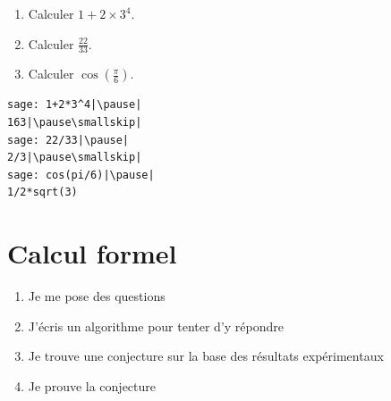 \begin{frame}[fragile]


\begin{tp}
\begin{enumerate}
  \item Calculer $1+2 \times 3^4$.
  \item Calculer $\frac{22}{33}$.
  \item Calculer $\cos(\frac{\pi}{6})$.
\end{enumerate}  
\end{tp}

\pause

\begin{algo}
\begin{lstlisting}
sage: 1+2*3^4|\pause|
163|\pause\smallskip|
sage: 22/33|\pause|
2/3|\pause\smallskip|
sage: cos(pi/6)|\pause|
1/2*sqrt(3)
\end{lstlisting}
\end{algo}


\end{frame}



\section{Calcul formel}

\begin{frame}
  
\pause

\begin{enumerate}
  \item Je me pose des questions
  \pause\medskip
  \item J'écris un algorithme pour tenter d'y répondre
  \pause\medskip
  \item Je trouve une conjecture sur la base des résultats expérimentaux
  \pause\medskip
  \item Je prouve la conjecture
\end{enumerate}

\end{frame}



